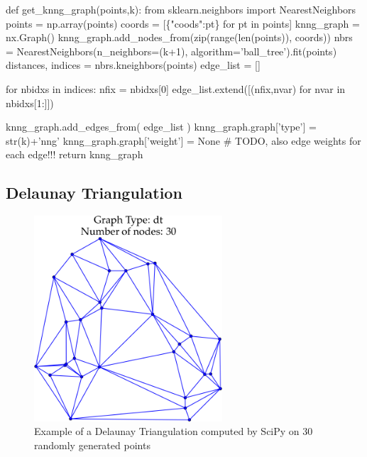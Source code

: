 \nwenddocs{}\endmoddef\nwstartdeflinemarkup{}\nwenddeflinemarkup
def get_knng_graph(points,k):
     from sklearn.neighbors import NearestNeighbors
     points     = np.array(points)
     coords     = [\{"coods":pt\} for pt in points]
     knng_graph = nx.Graph()
     knng_graph.add_nodes_from(zip(range(len(points)), coords))
     nbrs = NearestNeighbors(n_neighbors=(k+1), algorithm='ball_tree').fit(points)
     distances, indices = nbrs.kneighbors(points)
     edge_list = []

     for nbidxs in indices:
          nfix = nbidxs[0]
          edge_list.extend([(nfix,nvar) for nvar in nbidxs[1:]])

     knng_graph.add_edges_from(  edge_list  )
     knng_graph.graph['type']   = str(k)+'nng'
     knng_graph.graph['weight'] =  None # TODO, also edge weights for each edge!!!
     return knng_graph
\nwendcode{}\nwdocspar


\subsection{Delaunay Triangulation}

\begin{figure}[ht]
  \centering
  \includegraphics[width=7cm]{./miscimages/dt-example.png}
  \caption{\label{fig:dt} Example of a Delaunay Triangulation computed by SciPy on 30 randomly generated points}
\end{figure}



